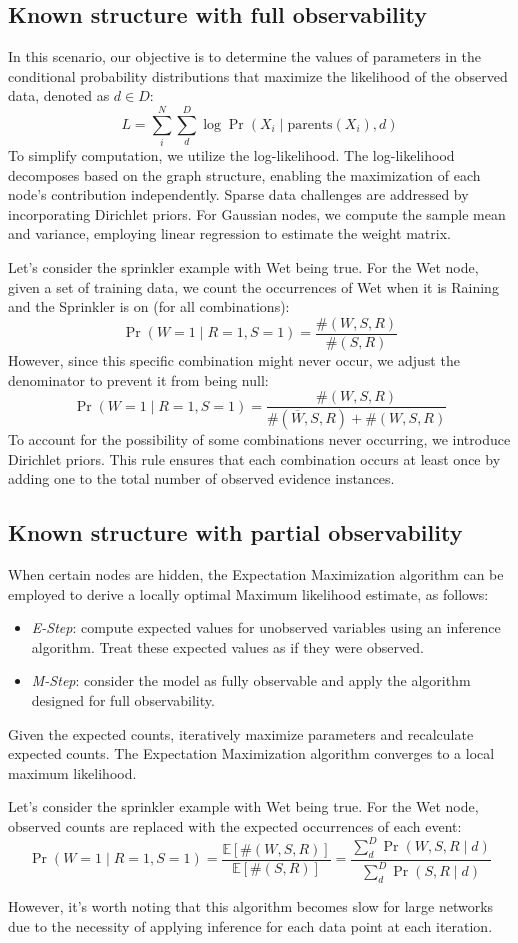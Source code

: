 \subsection{Known structure with full observability}
In this scenario, our objective is to determine the values of parameters in the conditional probability distributions that maximize the likelihood of the observed data, denoted as $d \in D$: 
\[L=\sum_i^N\sum_d^D \log \Pr(X_i\mid \text{parents}(X_i),d)\]
To simplify computation, we utilize the log-likelihood. 
The log-likelihood decomposes based on the graph structure, enabling the maximization of each node's contribution independently. 
Sparse data challenges are addressed by incorporating Dirichlet priors.
For Gaussian nodes, we compute the sample mean and variance, employing linear regression to estimate the weight matrix.
\begin{example}
    Let's consider the sprinkler example with Wet being true.
    For the Wet node, given a set of training data, we count the occurrences of Wet when it is Raining and the Sprinkler is on (for all combinations):
    \[\Pr(W=1\mid R=1,S=1)=\dfrac{\#(W,S,R)}{\#(S,R)}\]
    However, since this specific combination might never occur, we adjust the denominator to prevent it from being null:
    \[\Pr(W=1\mid R=1,S=1)=\dfrac{\#(W,S,R)}{\#(\overline{W},S,R)+\#(W,S,R)}\]
    To account for the possibility of some combinations never occurring, we introduce Dirichlet priors. 
    This rule ensures that each combination occurs at least once by adding one to the total number of observed evidence instances.
\end{example}

\subsection{Known structure with partial observability}
When certain nodes are hidden, the Expectation Maximization algorithm can be employed to derive a locally optimal Maximum likelihood estimate, as follows:
\begin{itemize}
    \item \textit{E-Step}: compute expected values for unobserved variables using an inference algorithm. 
        Treat these expected values as if they were observed.
    \item \textit{M-Step}: consider the model as fully observable and apply the algorithm designed for full observability.
\end{itemize}
Given the expected counts, iteratively maximize parameters and recalculate expected counts. 
The Expectation Maximization algorithm converges to a local maximum likelihood.
\begin{example}
    Let's consider the sprinkler example with Wet being true. 
    For the Wet node, observed counts are replaced with the expected occurrences of each event:
    \[\Pr(W=1\mid R=1,S=1)=\dfrac{\mathbb{E}\left[\#(W,S,R)\right]}{\mathbb{E}\left[\#(S,R)\right]}=\dfrac{\sum_d^D\Pr(W,S,R\mid d)}{\sum_d^D\Pr(S,R\mid d)}\]
\end{example}
However, it's worth noting that this algorithm becomes slow for large networks due to the necessity of applying inference for each data point at each iteration.

